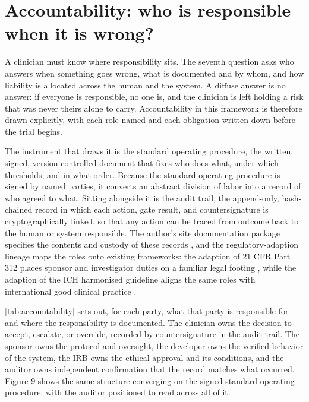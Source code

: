 \section{Accountability: who is responsible when it is wrong?}
\label{sec:accountability}

A clinician must know where responsibility sits. The seventh question asks who
answers when something goes wrong, what is documented and by whom, and how
liability is allocated across the human and the system. A diffuse answer is no
answer: if everyone is responsible, no one is, and the clinician is left holding a
risk that was never theirs alone to carry. Accountability in this framework is
therefore drawn explicitly, with each role named and each obligation written down
before the trial begins.

The instrument that draws it is the standard operating procedure, the written,
signed, version-controlled document that fixes who does what, under which
thresholds, and in what order. Because the standard operating procedure is signed
by named parties, it converts an abstract division of labor into a record of who
agreed to what. Sitting alongside it is the audit trail, the append-only,
hash-chained record in which each action, gate result, and countersignature is
cryptographically linked, so that any action can be traced from outcome back to the
human or system responsible. The author's site documentation package specifies the
contents and custody of these records \cite{Kawchak2026PhysicalAIOncologyClinical},
and the regulatory-adaption lineage maps the roles onto existing frameworks: the
adaption of 21 CFR Part 312 places sponsor and investigator duties on a familiar
legal footing \cite{Kawchak2026Adaption21CFRPart}, while the adaption of the ICH
harmonised guideline aligns the same roles with international good clinical practice
\cite{Kawchak2026AdaptionICHHarmonisedGuideline}.

\autoref{tab:accountability} sets out, for each party, what that party is
responsible for and where the responsibility is documented. The clinician owns the
decision to accept, escalate, or override, recorded by countersignature in the
audit trail. The sponsor owns the protocol and oversight, the developer owns the
verified behavior of the system, the IRB owns the ethical approval and its
conditions, and the auditor owns independent confirmation that the record matches
what occurred. Figure 9 shows the same structure converging on the signed standard
operating procedure, with the auditor positioned to read across all of it.

